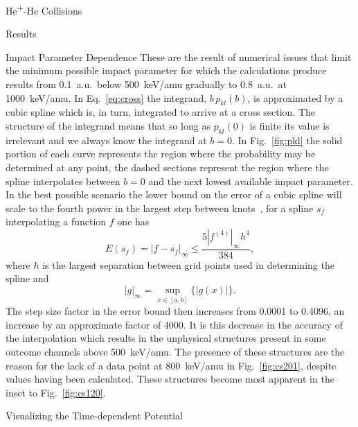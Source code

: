 \documentclass[a5paper, 9 pt]{extreport}
\begin{document}
\begin{chapter}{\texorpdfstring{He\textsuperscript{+}}{He+}-He Collisions \label{chap:hephe}}
\begin{section}{Results \label{sec:hephe-disc}}
\begin{subsection}{Impact Parameter Dependence \label{sec:hephepb}}
         These are the result of numerical issues that limit the minimum possible impact parameter for
         which the calculations produce results from 0.1~a.u.\ below 500~keV/amu gradually to 0.8~a.u.\
         at 1000~keV/amu. In Eq.~\eqref{eq:cross} the integrand, $b \, p_{kl}(b)$, is approximated by a
         cubic spline which is, in turn, integrated to arrive at a cross section. The structure of the
         integrand means that so long as $p_{kl}(0)$ is finite its value is irrelevant and we always
         know the integrand at $b = 0$. In Fig.~\ref{fig:pkl} the solid portion of each curve represents
         the region where the probability may be determined at any point, the dashed sections represent
         the region where the spline interpolates between $b = 0$ and the next lowest available impact
         parameter. In the best possible scenario the lower bound on the error of a cubic spline will
         scale to the fourth power in the largest step between knots~\cite{spline-err}, for a spline
         $s_f$ interpolating a function $f$ one has
         \begin{equation} \label{eq:splineErr}
            E(s_f) = \left| f - s_f \right|_\infty \leq \frac{5 \left| f^{(4)} \right|_\infty h^4}{384},
         \end{equation}
         where $h$ is the largest separation between grid points used in determining the spline and
         \begin{equation} \label{eq:supnorm}
            | g |_\infty = \sup\limits_{x \in [a,b]} \{ |g(x)| \}.
         \end{equation}
         The step size factor in the error bound then increases from 0.0001 to 0.4096, an increase by an
         approximate factor of 4000. It is this decrease in the accuracy of the interpolation which
         results in the unphysical structures present in some outcome channels above 500~keV/amu. The
         presence of these structures are the reason for the lack of a data point at 800~keV/amu in
         Fig.~\ref{fig:cs201}, despite values having been calculated. These structures become most
         apparent in the inset to Fig.~\ref{fig:cs120}.

      \end{subsection}

      \begin{subsection}{Visualizing the Time-dependent Potential \label{sec:visual}}


\end{subsection}
\end{section}
\end{chapter}
\end{document}

